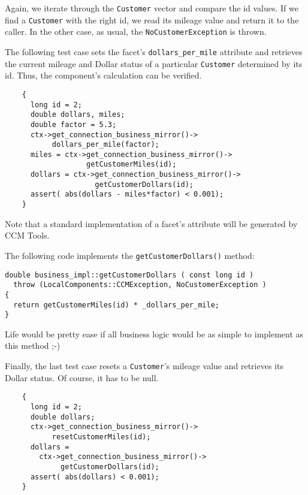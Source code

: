 Again, we iterate through the {\tt Customer} vector and compare the id values.
If we find a {\tt Customer} with the right id, we read its mileage value and
return it to the caller.
In the other case, as usual, the {\tt NoCustomerException} is thrown.


The following test case sets the facet's {\tt dollars\_per\_mile} attribute
and retrieves the current mileage and Dollar status of a particular 
{\tt Customer} determined by its id.
Thus, the component's calculation can be verified.

\begin{small}
\begin{verbatim}
    {
      long id = 2;
      double dollars, miles;
      double factor = 5.3;
      ctx->get_connection_business_mirror()->
           dollars_per_mile(factor);
      miles = ctx->get_connection_business_mirror()->
                   getCustomerMiles(id);
      dollars = ctx->get_connection_business_mirror()->
                     getCustomerDollars(id); 
      assert( abs(dollars - miles*factor) < 0.001);
    }
\end{verbatim}
\end{small}

Note that a standard implementation of a facet's attribute will be
generated by CCM Tools.

The following code implements the {\tt getCustomerDollars()} method:
\begin{small}
\begin{verbatim}
double business_impl::getCustomerDollars ( const long id )
  throw (LocalComponents::CCMException, NoCustomerException )
{
  return getCustomerMiles(id) * _dollars_per_mile;
}
\end{verbatim}
\end{small}

Life would be pretty ease if all business logic would be as simple to implement 
as this method ;-)


\newpage
Finally, the last test case resets a {\tt Customer}'s mileage value and 
retrieves its Dollar status. Of course, it has to be null.

\begin{small}
\begin{verbatim}
    {
      long id = 2;
      double dollars;
      ctx->get_connection_business_mirror()->
           resetCustomerMiles(id);
      dollars = 
        ctx->get_connection_business_mirror()->
             getCustomerDollars(id); 
      assert( abs(dollars) < 0.001);
    }
\end{verbatim}
\end{small}

